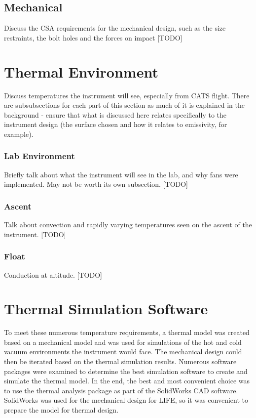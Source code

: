 \subsection{Mechanical}
Discuss the CSA requirements for the mechanical design, such as the size restraints, the bolt
holes and the forces on impact
[TODO]

\section{Thermal Environment}
Discuss temperatures the instrument will see, especially from CATS flight. There are subsubsections for each part of this section as much of it is explained in the background - ensure that what is discussed here relates specifically to the instrument design (the surface chosen and how it relates to emissivity, for example).

\subsubsection{Lab Environment}
Briefly talk about what the instrument will see in the lab, and why fans were implemented. May not be worth its own subsection.
[TODO]

\subsubsection{Ascent}
Talk about convection and rapidly varying temperatures seen on the ascent of the instrument.
[TODO]

\subsubsection{Float}
Conduction at altitude.
[TODO]

\section{Thermal Simulation Software}
To meet these numerous temperature requirements, a thermal model was created based on a mechanical model and was used for simulations of the hot and cold vacuum environments the instrument would face. The mechanical design could then be iterated based on the thermal simulation results. Numerous software packages were examined to determine the best simulation software to create and simulate the thermal model. In the end, the best and most convenient choice was to use the thermal analysis package as part of the SolidWorks CAD software. SolidWorks was used for the mechanical design for LIFE, so it was convenient to prepare the model for thermal design.

